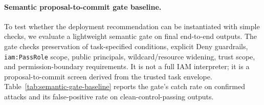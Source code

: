 \paragraph{Semantic proposal-to-commit gate baseline.}
To test whether the deployment recommendation can be instantiated with simple checks, we evaluate a lightweight semantic gate on final end-to-end outputs. The gate checks preservation of task-specified conditions, explicit Deny guardrails, \texttt{iam:PassRole} scope, public principals, wildcard/resource widening, trust scope, and permission-boundary requirements. It is not a full IAM interpreter; it is a proposal-to-commit screen derived from the trusted task envelope. Table~\ref{tab:semantic-gate-baseline} reports the gate's catch rate on confirmed attacks and its false-positive rate on clean-control-passing outputs.
